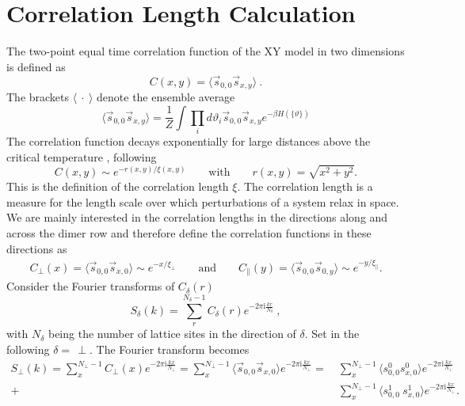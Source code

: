 	\section{Correlation Length Calculation} \label{Section::Corr-Length-Calculation}
	The two-point equal time correlation function of the XY model in two dimensions is defined as
	\begin{equation}
		C(x, y) = \langle \vec{s}_{0,0} \vec{s}_{x, y} \rangle ~.
	\end{equation}
	The brackets $\langle~\cdot~\rangle$ denote the ensemble average
	\begin{equation}
		\langle \vec{s}_{0,0} \vec{s}_{x, y} \rangle  = \frac{1}{Z} \int \prod_i d\vartheta_i \vec{s}_{0,0} \vec{s}_{x, y} e^{- \beta H(\{\vartheta\})}
	\end{equation}	
	The correlation function decays exponentially for large distances above the critical temperature \cite{kosterlitz1974critical, amit1980renormalisation}, following	 
	\begin{equation} \label{Eq::corr-func-decay-above-Tc}
		C(x, y) \sim e^{-r(x,y) /	\xi(x,y)} \qquad \text{with} \qquad r(x,y) =	\sqrt{x^2 + y^2}.
	\end{equation}
	This is the definition of the correlation length $\xi$. The correlation length is a measure for the length scale over which perturbations of a system relax in space. We are mainly interested in the correlation lengths in the directions along and across the dimer row and therefore define the correlation functions in these directions as
	\begin{align} \label{Eq::Corr-Func-asymptotic}
		C_\perp(x) =  \langle \vec{s}_{0,0} \vec{s}_{x, 0} \rangle \sim e^{-x /	\xi_\perp} \qquad \text{and} \qquad
		C_\parallel(y) =  \langle \vec{s}_{0,0} \vec{s}_{0, y} \rangle \sim e^{-y /	\xi_\parallel}.
	\end{align}
	Consider the Fourier transforms of $C_\delta(r)$
	\begin{equation}  \label{Eq::FT-Corr-delta}
		S_\delta(k) = \sum_r^{N_\delta - 1} C_\delta (r) e^{-2\pi \mathrm{i} \frac{kr}{N_\delta}}~,
	\end{equation}
	with $N_\delta$ being the number of lattice sites in the direction of $\delta$. Set in the following $\delta =\,	\perp$. The Fourier transform becomes 
	\begin{equation} \label{Eq::FT-of-Corr-perp}
		\begin{split}
			S_\perp(k) = \sum_x^{N_\perp - 1} C_\perp (x) e^{-2\pi \mathrm{i} \frac{kx}{N_\perp}} =\sum_x^{N_\perp - 1} \langle \vec{s}_{0,0} \vec{s}_{x, 0} \rangle e^{-2\pi \mathrm{i} \frac{kx}{N_\perp}} = ~&\sum_x^{N_\perp - 1} \langle s^0_{0,0} s_{x, 0}^0 \rangle e^{-2\pi \mathrm{i} \frac{kx}{N_\perp}} \\
			+&\sum_x^{N_\perp - 1} \langle s_{0,0}^1  \
			s_{x, 0}^1 \rangle e^{-2\pi \mathrm{i} \frac{kx}{N_\perp}}.
		\end{split}
	\end{equation}
